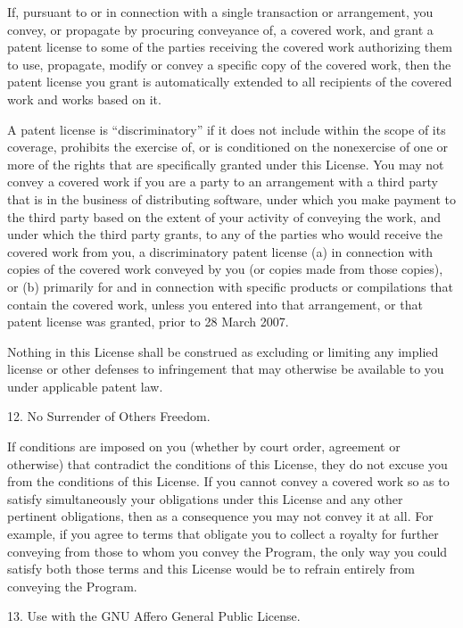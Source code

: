 \documentclass[letterpaper,10pt,english]{sphinxmanual}
\begin{document}
\begin{sphinxVerbatim}[commandchars=\\\{\}]
    If, pursuant to or in connection with a single transaction or arrangement,
    you convey, or propagate by procuring conveyance of, a covered work, and
    grant a patent license to some of the parties receiving the covered work
    authorizing them to use, propagate, modify or convey a specific copy of the
    covered work, then the patent license you grant is automatically extended
    to all recipients of the covered work and works based on it.

    A patent license is “discriminatory” if it does not include within the
    scope of its coverage, prohibits the exercise of, or is conditioned on the
    non\PYGZhy{}exercise of one or more of the rights that are specifically granted
    under this License. You may not convey a covered work if you are a party to
    an arrangement with a third party that is in the business of distributing
    software, under which you make payment to the third party based on the
    extent of your activity of conveying the work, and under which the third
    party grants, to any of the parties who would receive the covered work from
    you, a discriminatory patent license (a) in connection with copies of the
    covered work conveyed by you (or copies made from those copies), or (b)
    primarily for and in connection with specific products or compilations that
    contain the covered work, unless you entered into that arrangement, or that
    patent license was granted, prior to 28 March 2007.

    Nothing in this License shall be construed as excluding or limiting any
    implied license or other defenses to infringement that may otherwise be
    available to you under applicable patent law.

 12. No Surrender of Others\PYGZsq{} Freedom.

   If conditions are imposed on you (whether by court order, agreement or
   otherwise) that contradict the conditions of this License, they do not
   excuse you from the conditions of this License. If you cannot convey a
   covered work so as to satisfy simultaneously your obligations under this
   License and any other pertinent obligations, then as a consequence you may
   not convey it at all. For example, if you agree to terms that obligate you
   to collect a royalty for further conveying from those to whom you convey the
   Program, the only way you could satisfy both those terms and this License
   would be to refrain entirely from conveying the Program.

13. Use with the GNU Affero General Public License.


\end{sphinxVerbatim}
\end{document}
